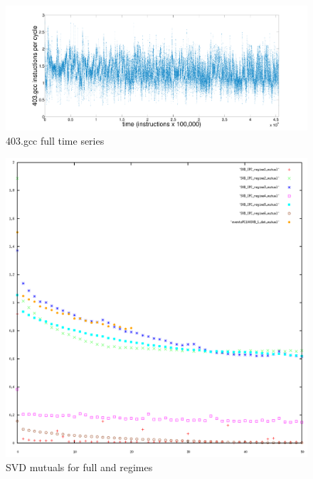 \documentclass{article}
\begin{document}
\begin{figure}[htbp]
\begin{center}
\includegraphics[width=\textwidth]{figs/gccfullts}\caption{403.gcc full time series}
\label{default}
\end{center}
\end{figure}





\begin{figure}[htbp]
\begin{center}
\includegraphics[width=\textwidth]{figs/svd_mutuals}\caption{SVD mutuals for full and regimes}
\label{default}
\end{center}
\end{figure}
\end{document}
